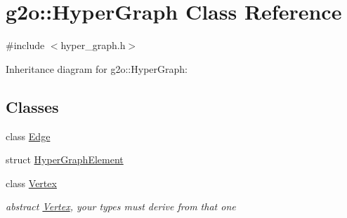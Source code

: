 \hypertarget{classg2o_1_1HyperGraph}{}\section{g2o\+:\+:Hyper\+Graph Class Reference}
\label{classg2o_1_1HyperGraph}


{\ttfamily \#include $<$hyper\+\_\+graph.\+h$>$}



Inheritance diagram for g2o\+:\+:Hyper\+Graph\+:
\subsection*{Classes}
\begin{DoxyCompactItemize}
\item 
class \hyperlink{classg2o_1_1HyperGraph_1_1Edge}{Edge}
\item 
struct \hyperlink{structg2o_1_1HyperGraph_1_1HyperGraphElement}{Hyper\+Graph\+Element}
\item 
class \hyperlink{classg2o_1_1HyperGraph_1_1Vertex}{Vertex}
\begin{DoxyCompactList}\small\item\em abstract \hyperlink{classg2o_1_1HyperGraph_1_1Vertex}{Vertex}, your types must derive from that one \end{DoxyCompactList}\end{DoxyCompactItemize}
